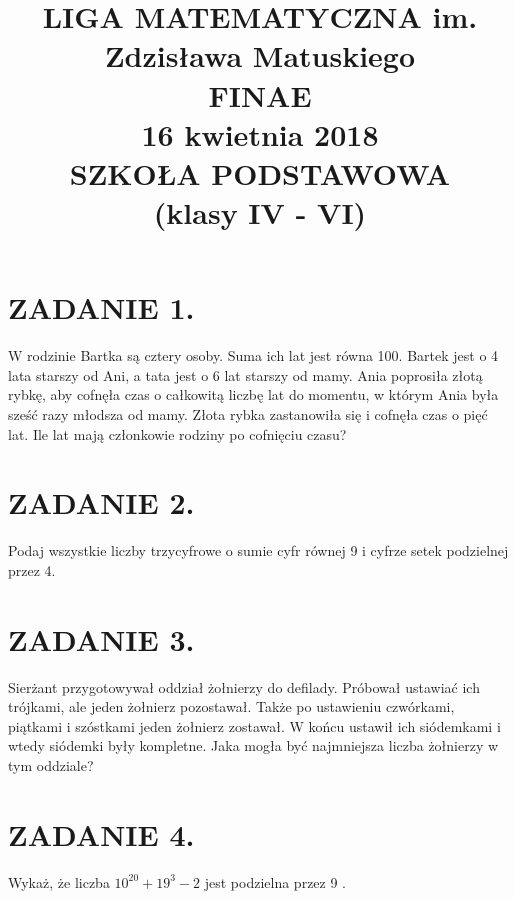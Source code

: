 \documentclass[10pt]{article}
\title{LIGA MATEMATYCZNA im. Zdzisława Matuskiego \\
 FINAE \\
 16 kwietnia 2018 \\
 SZKOŁA PODSTAWOWA \\
 (klasy IV - VI) }
\author{}
\date{}
\begin{document}
\maketitle
\section*{ZADANIE 1.}
W rodzinie Bartka są cztery osoby. Suma ich lat jest równa 100. Bartek jest o 4 lata starszy od Ani, a tata jest o 6 lat starszy od mamy. Ania poprosiła złotą rybkę, aby cofnęła czas o całkowitą liczbę lat do momentu, w którym Ania była sześć razy młodsza od mamy. Złota rybka zastanowiła się i cofnęła czas o pięć lat. Ile lat mają członkowie rodziny po cofnięciu czasu?

\section*{ZADANIE 2.}
Podaj wszystkie liczby trzycyfrowe o sumie cyfr równej 9 i cyfrze setek podzielnej przez 4.

\section*{ZADANIE 3.}
Sierżant przygotowywał oddział żołnierzy do defilady. Próbował ustawiać ich trójkami, ale jeden żołnierz pozostawał. Także po ustawieniu czwórkami, piątkami i szóstkami jeden żołnierz zostawał. W końcu ustawił ich siódemkami i wtedy siódemki były kompletne. Jaka mogła być najmniejsza liczba żołnierzy w tym oddziale?

\section*{ZADANIE 4.}
Wykaż, że liczba \(10^{20}+19^{3}-2\) jest podzielna przez 9 .
\end{document}
